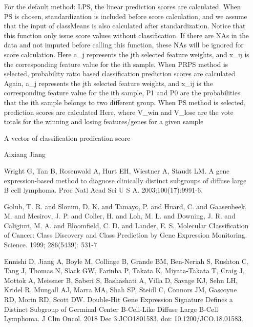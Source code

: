 \documentclass[letterpaper]{book}
\begin{document}
\begin{Details}\relax
For the default method: LPS, the linear prediction scores are calculated. When PS is chosen, standardization is included 
before score calculation, and we assume that the input of classMeans is also calculated after standardization. 
Notice that this function only issue score values without classification. 
If there are NAs in the data and not imputed before calling this function, these NAs will be ignored for score calculation.
Here a\_j represents the jth selected feature weights, and x\_ij is the corresponding feature value for the ith sample.
When PRPS method is selected, probability ratio based classification prediction scores are calculated
Again, a\_j represents the jth selected feature weights, and x\_ij is the corresponding feature value for the ith sample, 
P1 and P0 are the probabilities that the ith sample belongs to two different group.
When PS method is selected, prediction scores are calculated
Here, where V\_win and V\_lose are the vote totals for the winning and losing features/genes for a given sample
\end{Details}
%
\begin{Value}
A vector of classification predication score
\end{Value}
%
\begin{Author}\relax
Aixiang Jiang
\end{Author}
%
\begin{References}\relax
Wright G, Tan B, Rosenwald A, Hurt EH, Wiestner A, Staudt LM. A gene expression-based method to diagnose
clinically distinct subgroups of diffuse large B cell lymphoma. Proc Natl Acad Sci U S A. 2003;100(17):9991-6.

Golub, T. R. and Slonim, D. K. and Tamayo, P. and Huard, C. and Gaasenbeek, M. and Mesirov, J. P. and
Coller, H. and Loh, M. L. and Downing, J. R. and Caligiuri, M. A. and Bloomfield, C. D. and Lander, E. S.
Molecular Classification of Cancer: Class Discovery and Class Prediction by Gene Expression Monitoring. 
Science. 1999; 286(5439): 531-7

Ennishi D, Jiang A, Boyle M, Collinge B, Grande BM, Ben-Neriah S, Rushton C, Tang J, Thomas N, Slack GW, Farinha P,
Takata K, Miyata-Takata T, Craig J, Mottok A, Meissner B, Saberi S, Bashashati A, Villa D, Savage KJ, Sehn LH, 
Kridel R, Mungall AJ, Marra MA, Shah SP, Steidl C, Connors JM, Gascoyne RD, Morin RD, Scott DW. 
Double-Hit Gene Expression Signature Defines a Distinct Subgroup of Germinal Center B-Cell-Like Diffuse Large B-Cell Lymphoma.
J Clin Oncol. 2018 Dec 3:JCO1801583. doi: 10.1200/JCO.18.01583.
\end{References}
\end{document}
